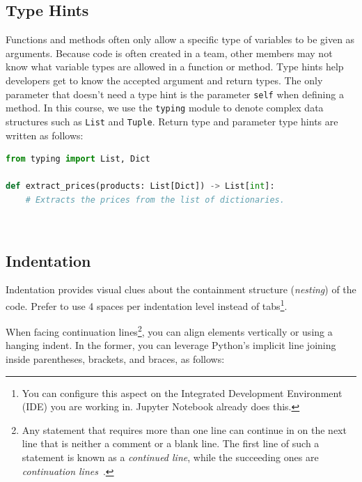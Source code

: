 \documentclass{tufte-handout}
\begin{document}
\subsection{Type Hints}
Functions and methods often only allow a specific type of variables to be given as arguments.
Because code is often created in a team, other members may not know what variable types are allowed in a function or method.
Type hints help developers get to know the accepted argument and return types.
The only parameter that doesn't need a type hint is the parameter \texttt{self} when defining a method.
In this course, we use the \texttt{typing} module to denote complex data structures such as \texttt{List} and \texttt{Tuple}.
Return type and parameter type hints are written as follows:

%




\begin{lstlisting}[numbers=none,language=python]
from typing import List, Dict

def extract_prices(products: List[Dict]) -> List[int]:
    # Extracts the prices from the list of dictionaries.
\end{lstlisting}

\


\subsection{Indentation}

Indentation provides visual clues about the containment structure (\emph{nesting\/}) of the code.
Prefer to use 4 spaces per indentation level instead of tabs\footnote{You can configure this aspect on the Integrated Development Environment (IDE) you are working in. Jupyter Notebook already does this.}.

When facing continuation lines\footnote{Any statement that requires more than one line can continue in on the next line that is neither a comment or a blank line. The first line of such a statement is known as a \emph{continued line}, while the succeeding ones are \emph{continuation lines}~\cite{ibm2022continuation}.}, you can align elements vertically or using a hanging indent.
In the former, you can leverage Python's implicit line joining inside parentheses, brackets, and braces, as follows:
\end{document}

